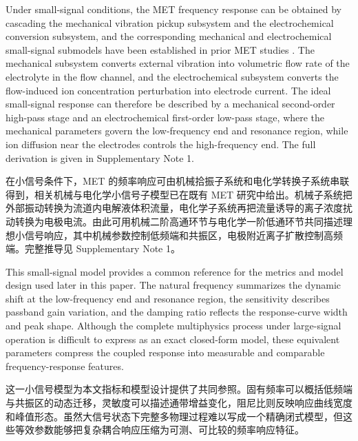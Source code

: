 \documentclass[sn-nature]{sn-jnl}
\newif\ifCNENEnglish
\newif\ifCNENBilingual
\newcommand{\CNEN}[2]{%
    \ifCNENBilingual
        #1%
        \if\relax\detokenize{#2}\relax\else\par #2\fi%
    \else
        \ifCNENEnglish
            #2%
        \else
            #1%
        \fi
    \fi
}
\begin{document}
\CNEN{在小信号条件下，MET 的频率响应可由机械拾振子系统和电化学转换子系统串联得到，相关机械与电化学小信号子模型已在既有 MET 研究中给出\cite{WOS:000318036400036,agafonov2015,sun_influence_2011,sun_numerical_2012,kozlov_frequency_2002}。机械子系统把外部振动转换为流道内电解液体积流量，电化学子系统再把流量诱导的离子浓度扰动转换为电极电流。由此可用机械二阶高通环节与电化学一阶低通环节共同描述理想小信号响应，其中机械参数控制低频端和共振区，电极附近离子扩散控制高频端。完整推导见 Supplementary Note 1。}{Under small-signal conditions, the MET frequency response can be obtained by cascading the mechanical vibration pickup subsystem and the electrochemical conversion subsystem, and the corresponding mechanical and electrochemical small-signal submodels have been established in prior MET studies \cite{WOS:000318036400036,agafonov2015,sun_influence_2011,sun_numerical_2012,kozlov_frequency_2002}. The mechanical subsystem converts external vibration into volumetric flow rate of the electrolyte in the flow channel, and the electrochemical subsystem converts the flow-induced ion concentration perturbation into electrode current. The ideal small-signal response can therefore be described by a mechanical second-order high-pass stage and an electrochemical first-order low-pass stage, where the mechanical parameters govern the low-frequency end and resonance region, while ion diffusion near the electrodes controls the high-frequency end. The full derivation is given in Supplementary Note 1.%
}

\CNEN{这一小信号模型为本文指标和模型设计提供了共同参照。固有频率可以概括低频端与共振区的动态迁移，灵敏度可以描述通带增益变化，阻尼比则反映响应曲线宽度和峰值形态。虽然大信号状态下完整多物理过程难以写成一个精确闭式模型，但这些等效参数能够把复杂耦合响应压缩为可测、可比较的频率响应特征。}{This small-signal model provides a common reference for the metrics and model design used later in this paper. The natural frequency summarizes the dynamic shift at the low-frequency end and resonance region, the sensitivity describes passband gain variation, and the damping ratio reflects the response-curve width and peak shape. Although the complete multiphysics process under large-signal operation is difficult to express as an exact closed-form model, these equivalent parameters compress the coupled response into measurable and comparable frequency-response features.}
\end{document}
